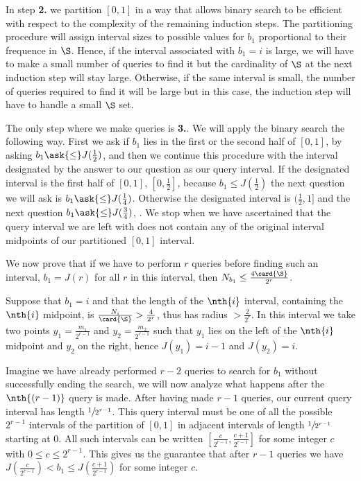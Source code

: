 In step \textbf{2.} we partition $[0,1]$ in a way that allows binary search to
be efficient with respect to the complexity of the remaining induction steps.
The partitioning procedure will assign interval sizes to possible values for
$b_1$ proportional to their frequence in $\S$. Hence, if the interval
associated with $b_1 = i$ is large, we will have to make a small number of
queries to find it but the cardinality of $\S$ at the next induction step will
stay large.  Otherwise, if the same interval is small, the number of queries
required to find it will be large but in this case, the induction step will
have to handle a small $\S$ set.

The only step where we make queries is \textbf{3.}. We will apply the binary
search the following way. First we ask if $b_1$ lies in the first or the second
half of $[0,1]$, by asking $b_1 \ask{\le} J(\frac{1}{2})$, and then we continue
this procedure with the interval designated by the answer to our question as
our query interval. If the designated interval is the first half of $[0,1]$,
\ie $[0, \frac{1}{2}]$, because $b_1 \le J(\frac{1}{2})$ the next question we
will ask is $b_1 \ask{\le} J(\frac{1}{4})$. Otherwise the designated interval
is $(\frac{1}{2},1]$ and the next question $b_1 \ask{\le} J(\frac{3}{4})$,
\etc. We stop when we have ascertained that the query interval we are left with
does not contain any of the original interval midpoints of our partitioned
$[0,1]$ interval.

We now prove that if we have to perform $r$ queries before
finding such an interval, $b_1 = J(r)$ for all $r$ in this interval, then
$N_{b_1} \le \frac{4\card{\S}}{2^r}$.

Suppose that $b_1 = i$ and that the length of the $\nth{i}$ interval, containing
the $\nth{i}$ midpoint, is $\frac{N_i}{\card{\S}} > \frac{4}{2^r}$, thus has
radius $> \frac{2}{2^r}$. In this interval we take two points $y_1 =
\frac{m_1}{2^{r-1}}$ and $y_2 = \frac{m_2}{2^{r-1}}$ such that $y_1$ lies on
the left of the $\nth{i}$ midpoint and $y_2$ on the right, hence $J(y_1) = i -
1$ and $J(y_2) = i$.

Imagine we have already performed $r-2$ queries to search for $b_1$ without
successfully ending the search, we will now analyze what happens after the
$\nth{(r-1)}$ query is made. After having made $r-1$ queries, our current query
interval has length $\sfrac{1}{2^{r-1}}$. This query interval must be one of
all the possible $2^{r-1}$ intervals of the partition of $[0,1]$ in adjacent
intervals of length $\sfrac{1}{2^{r-1}}$ starting at $0$. All such intervals
can be written $[\frac{c}{2^{r-1}}, \frac{c+1}{2^{r-1}}]$ for some integer $c$
with $0 \le c \le 2^{r-1}$. This gives us the guarantee that after $r-1$
queries we have $J(\frac{c}{2^{r-1}}) < b_1 \le J(\frac{c+1}{2^{r-1}})$ for
some integer $c$.

